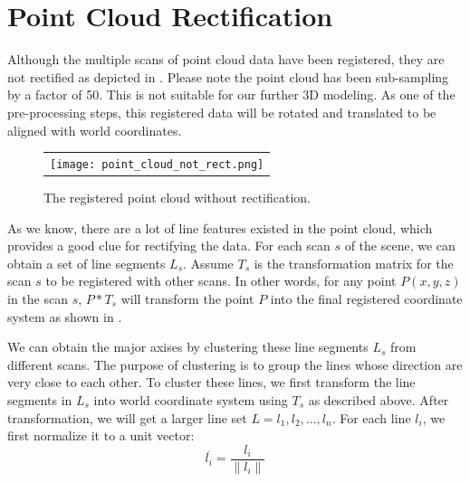 \section{Point Cloud Rectification}
\label{sec:rect}

Although the multiple scans of point cloud data have been registered, 
they are not rectified as depicted in . 
Please note the point cloud has been sub-sampling by a factor of 50.
This is not suitable for our further 3D modeling.
As one of the pre-processing steps, this registered data will be rotated
and translated to be aligned with world coordinates.

\begin{figure}[htbp]
\begin{center}
\begin{tabular}{c}
\texttt{[image: point\_cloud\_not\_rect.png]}
\end{tabular}
\end{center}
\caption{ The registered point cloud without rectification. }
\label{fig:pc_orig}
\end{figure}

As we know, there are a lot of line features existed in the point cloud, which
provides a good clue for rectifying the data. 
For each scan $s$ of the scene, we can obtain a set of line segments $L_s$. 
Assume $T_s$ is the transformation matrix for the scan $s$ to be registered with other scans.
In other words, for any point $P(x,y,z)$ in the scan $s$, $P*T_s$ will transform the
point $P$ into the final registered coordinate system as shown in .

We can obtain the major axises by clustering these line segments $L_s$ from different
scans. The purpose of clustering is to group the lines whose direction are very close to each other.
To cluster these lines, we first transform the line segments in $L_s$ into world
coordinate system using $T_s$ as described above. After transformation, we will
get a larger line set $L = {l_1, l_2, \ldots, l_n}$. For each line $l_i$, we first
normalize it to a unit vector:
\begin{equation*}
\overline{l_i} = \frac{l_i}{\parallel l_i \parallel}
\end{equation*}

